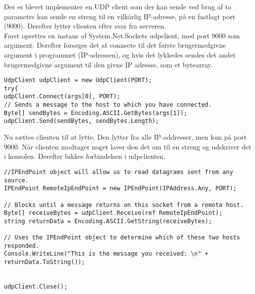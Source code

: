 
\noindent Der er blevet implementer en UDP client som der kan sende ved brug af to parametre kan sende en streng til en vilkårlig IP-adresse, på en fastlagt port (9000). Derefter lytter clienten efter svar fra serveren.\\
\noindent Først oprettes en instans af System.Net.Sockets udpclient, med port 9000 som argument. Derefter forsøges det at connecte til det første brugermedgivne argument i programmet (IP-adressen), og hvis det lykkedes sendes det andet brugermedgivne argument til den givne IP adresse, som et bytearray.  
\begin{verbatim}
UdpClient udpClient = new UdpClient(PORT);
try{
udpClient.Connect(args[0], PORT);
// Sends a message to the host to which you have connected.
Byte[] sendBytes = Encoding.ASCII.GetBytes(args[1]);
udpClient.Send(sendBytes, sendBytes.Length);
\end{verbatim}

Nu sættes clienten til at lytte. Den lytter fra alle IP-addresser, men kun på port 9000. Når clienten modtager noget laver den det om til en streng og udskriver det i konsolen. Derefter lukkes forbindelsen i udpclienten.

\begin{verbatim}
//IPEndPoint object will allow us to read datagrams sent from any source.
IPEndPoint RemoteIpEndPoint = new IPEndPoint(IPAddress.Any, PORT);

// Blocks until a message returns on this socket from a remote host.
Byte[] receiveBytes = udpClient.Receive(ref RemoteIpEndPoint); 
string returnData = Encoding.ASCII.GetString(receiveBytes);

// Uses the IPEndPoint object to determine which of these two hosts responded.
Console.WriteLine("This is the message you received: \n" +
returnData.ToString());


udpClient.Close();
\end{verbatim}






